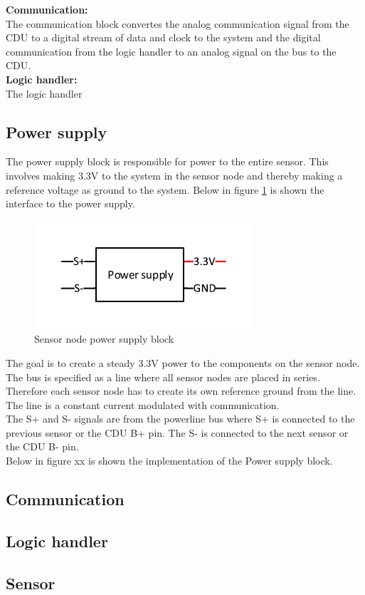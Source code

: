 \textbf{Communication:}\\
The communication block convertes the analog communication signal from the CDU to a digital stream of data and clock to the system and the digital communication from the logic handler to an analog signal on the bus to the CDU.\\

\textbf{Logic handler:}\\
The logic handler 

\subsection{Power supply}
The power supply block is responsible for power to the entire sensor. This involves making 3.3V to the system in the sensor node and thereby making a reference voltage as ground to the system. Below in figure \ref{fig:SN_PS_FIGURE} is shown the interface to the power supply.
\begin{figure}[H]
\centering
\includegraphics[width=.5\textwidth]{billeder/sn_powersupply_figure}
\caption{Sensor node power supply block}
\label{fig:SN_PS_FIGURE}
\end{figure} 
The goal is to create a steady 3.3V power to the components on the sensor node. The bus is specified as a line where all sensor nodes are placed in series. Therefore each sensor node has to create its own reference ground from the line. The line is a constant current modulated with communication.\\
The S+ and S- signals are from the powerline bus where S+ is connected to the previous sensor or the CDU B+ pin. The S- is connected to the next sensor or the CDU B- pin.\\

Below in figure xx is shown the implementation of the Power supply block.




\subsection{Communication}




\subsection{Logic handler}

\subsection{Sensor}